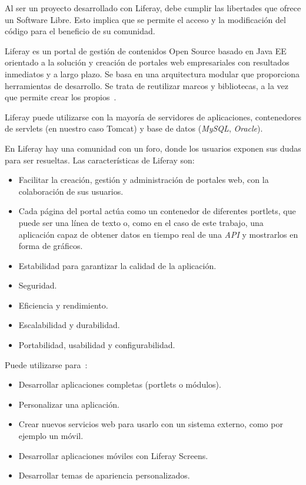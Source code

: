 \documentclass[a4paper, 12pt]{book}
\begin{document}
Al ser un proyecto desarrollado con Liferay, debe cumplir las libertades que ofrece un Software Libre. Esto implica que se permite el acceso y la modificación del código para el beneficio de su comunidad.


\vspace{5mm}
Liferay es un portal de gestión de contenidos Open Source basado en Java EE orientado a la solución y creación de portales web empresariales con resultados inmediatos y a largo plazo. Se basa en una arquitectura modular que proporciona herramientas de desarrollo. Se trata de reutilizar marcos y bibliotecas, a la vez que permite crear los propios~\cite{liferay_dev}.


\vspace{5mm}
Liferay puede utilizarse con la mayoría de servidores de aplicaciones, contenedores de servlets (en nuestro caso Tomcat) y base de datos (\textit{MySQL}, \textit{Oracle}).

\vspace{5mm}
En Liferay hay una comunidad con un foro, donde los usuarios exponen sus dudas para ser resueltas. Las características de Liferay son: 
\begin{itemize}
    \item Facilitar la creación, gestión y administración de portales web, con la colaboración de sus usuarios.
    \item Cada página del portal actúa como un contenedor de diferentes portlets, que puede ser una línea de texto o, como en el caso de este trabajo, una aplicación capaz de obtener datos en tiempo real de una \textit{API} y mostrarlos en forma de gráficos. 
    \item Estabilidad para garantizar la calidad de la aplicación.
    \item Seguridad.
    \item Eficiencia y rendimiento.
    \item Escalabilidad y durabilidad.
    \item Portabilidad, usabilidad y configurabilidad.
\end{itemize}

\vspace{5mm}
Puede utilizarse para~\cite{liferay_dev_tutorials}:
\begin{itemize}
\item Desarrollar aplicaciones completas (portlets o módulos).
\item Personalizar una aplicación.
\item Crear nuevos servicios web para usarlo con un sistema externo, como por ejemplo un móvil.
\item Desarrollar aplicaciones móviles con Liferay Screens.
\item Desarrollar temas de apariencia personalizados.
\end{itemize}
\end{document}
